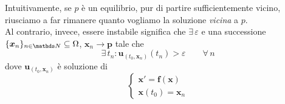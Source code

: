 Intuitivamente, se $p$ è un equilibrio, pur di partire sufficientemente vicino, riusciamo a far rimanere quanto vogliamo la soluzione \textit{vicina} a $p$.\\
Al contrario, invece, essere instabile significa che $ \exists\, \varepsilon $ e una successione $ \{\bm{x}_{n} \}_{n \in \N} \subseteq \Omega $, $ \bm{x}_{n} \to \bm{p} $ tale che \[
        \exists\, t_{n}\colon \bm{u}_{(t_0,\bm{x}_n)}(t_{n} )> \varepsilon \quad \quad \forall\, n
    \]dove $ \bm{u}_{(t_0,\bm{x}_n)} $ è soluzione di \[
        \begin{cases}
            \bm{x}'=\bm{f}(\bm{x})\\ 
            \bm{x}(t_0)=\bm{x}_n
        \end{cases}
    \]

